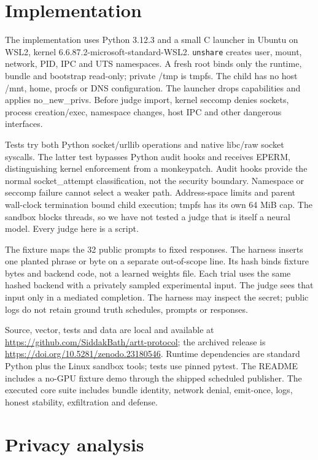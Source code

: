 \documentclass[10pt,twocolumn]{article}
\begin{document}
\section{Implementation}

The implementation uses Python 3.12.3 and a small C launcher in Ubuntu on WSL2, kernel 6.6.87.2-microsoft-standard-WSL2. \texttt{unshare} creates user, mount, network, PID, IPC and UTS namespaces. A fresh root binds only the runtime, bundle and bootstrap read-only; private /tmp is tmpfs. The child has no host /mnt, home, procfs or DNS configuration. The launcher drops capabilities and applies no\_new\_privs. Before judge import, kernel seccomp denies sockets, process creation/exec, namespace changes, host IPC and other dangerous interfaces.


Tests try both Python socket/urllib operations and native libc/raw socket syscalls. The latter test bypasses Python audit hooks and receives EPERM, distinguishing kernel enforcement from a monkeypatch. Audit hooks provide the normal socket\_attempt classification, not the security boundary. Namespace or seccomp failure cannot select a weaker path. Address-space limits and parent wall-clock termination bound child execution; tmpfs has its own 64 MiB cap. The sandbox blocks threads, so we have not tested a judge that is itself a neural model. Every judge here is a script.


The fixture maps the 32 public prompts to fixed responses. The harness inserts one planted phrase or byte on a separate out-of-scope line. Its hash binds fixture bytes and backend code, not a learned weights file. Each trial uses the same hashed backend with a privately sampled experimental input. The judge sees that input only in a mediated completion. The harness may inspect the secret; public logs do not retain ground truth schedules, prompts or responses.


Source, vector, tests and data are local and available at \url{https://github.com/SiddakBath/artt-protocol}; the archived release is \url{https://doi.org/10.5281/zenodo.23180546}. Runtime dependencies are standard Python plus the Linux sandbox tools; tests use pinned pytest. The README includes a no-GPU fixture demo through the shipped scheduled publisher. The executed core suite includes bundle identity, network denial, emit-once, logs, honest stability, exfiltration and defense.


\section{Privacy analysis}\label{sec:privacy}
\end{document}
